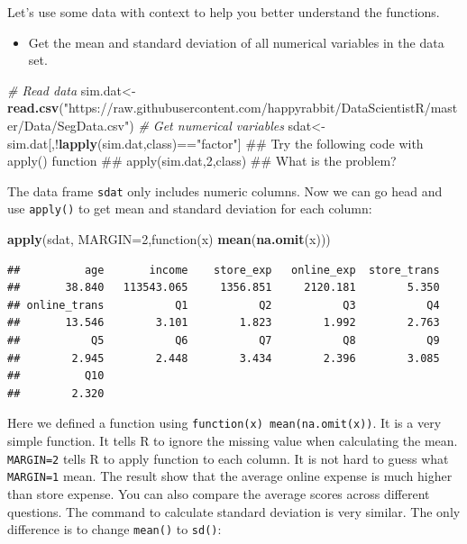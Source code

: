 \documentclass[]{book}
\newenvironment{Shaded}{\begin{snugshade}}{\end{snugshade}}
\newcommand{\KeywordTok}[1]{\textcolor[rgb]{0.13,0.29,0.53}{\textbf{{#1}}}}
\newcommand{\DataTypeTok}[1]{\textcolor[rgb]{0.13,0.29,0.53}{{#1}}}
\newcommand{\DecValTok}[1]{\textcolor[rgb]{0.00,0.00,0.81}{{#1}}}
\newcommand{\StringTok}[1]{\textcolor[rgb]{0.31,0.60,0.02}{{#1}}}
\newcommand{\CommentTok}[1]{\textcolor[rgb]{0.56,0.35,0.01}{\textit{{#1}}}}
\newcommand{\NormalTok}[1]{{#1}}
\providecommand{\tightlist}{%
  \setlength{\itemsep}{0pt}\setlength{\parskip}{0pt}}
\theoremstyle{definition}
\theoremstyle{definition}
\theoremstyle{remark}
\begin{document}
Let's use some data with context to help you better understand the
functions.

\begin{itemize}
\tightlist
\item
  Get the mean and standard deviation of all numerical variables in the
  data set.
\end{itemize}

\begin{Shaded}
\begin{Highlighting}[]
\CommentTok{# Read data}
\NormalTok{sim.dat<-}\KeywordTok{read.csv}\NormalTok{(}\StringTok{"https://raw.githubusercontent.com/happyrabbit/DataScientistR/master/Data/SegData.csv"}\NormalTok{)}
\CommentTok{# Get numerical variables}
\NormalTok{sdat<-sim.dat[,!}\KeywordTok{lapply}\NormalTok{(sim.dat,class)==}\StringTok{"factor"}\NormalTok{]}
\NormalTok{## Try the following code with apply() function}
\NormalTok{## apply(sim.dat,2,class)}
\NormalTok{## What is the problem?}
\end{Highlighting}
\end{Shaded}

The data frame \texttt{sdat} only includes numeric columns. Now we can
go head and use \texttt{apply()} to get mean and standard deviation for
each column:

\begin{Shaded}
\begin{Highlighting}[]
\KeywordTok{apply}\NormalTok{(sdat, }\DataTypeTok{MARGIN=}\DecValTok{2}\NormalTok{,function(x) }\KeywordTok{mean}\NormalTok{(}\KeywordTok{na.omit}\NormalTok{(x)))}
\end{Highlighting}
\end{Shaded}

\begin{verbatim}
##          age       income    store_exp   online_exp  store_trans 
##       38.840   113543.065     1356.851     2120.181        5.350 
## online_trans           Q1           Q2           Q3           Q4 
##       13.546        3.101        1.823        1.992        2.763 
##           Q5           Q6           Q7           Q8           Q9 
##        2.945        2.448        3.434        2.396        3.085 
##          Q10 
##        2.320
\end{verbatim}

Here we defined a function using \texttt{function(x)\ mean(na.omit(x))}.
It is a very simple function. It tells R to ignore the missing value
when calculating the mean. \texttt{MARGIN=2} tells R to apply function
to each column. It is not hard to guess what \texttt{MARGIN=1} mean. The
result show that the average online expense is much higher than store
expense. You can also compare the average scores across different
questions. The command to calculate standard deviation is very similar.
The only difference is to change \texttt{mean()} to \texttt{sd()}:
\end{document}
